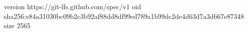version https://git-lfs.github.com/spec/v1
oid sha256:e84a31030bc09b2c3b92af88dd8df99ed789a1b99dc2de4d63d7a3d667e87348
size 2565
